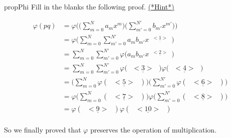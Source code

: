 \begin{exercise}{propPhi}
Fill in the blanks the following proof. \hyperref[sec:PolyVec:hints]{(*Hint*)} 

\begin{align*}
\varphi(pq) &= \varphi\Bigg(\Big(\sum^ {N}_{m=0} a_{m}x^{m}\Big)\Big( \sum^{N'}_{m'=0} b_{m'}x^{m'}\Big)\Bigg)\\
&= \varphi\Bigg(\sum^ {N}_{m=0}\sum^{N'}_{m'=0} a_{m}b_{m'} x^{\underline{\text{ $<1>$ }}} \Bigg)\\
&= \sum^ {N}_{m=0}\sum^{N'}_{m'=0}\varphi\big( a_{m}b_{m'} x^{\underline{\text{ $<2>$ }}} \big)\\
&= \sum^ {N}_{m=0}\sum^{N'}_{m'=0}\varphi\big( \underline{\text{ $<3>$ }} \big)\varphi\big(\underline{\text{ $<4>$ }}\big)\\
&= \Big(\sum^ {N}_{m=0}\varphi(\underline{\text{ $<5>$ }})\Big)\Big( \sum^{N'}_{m'=0}\varphi(\underline{\text{ $<6>$ }})\Big)\\
&= \varphi \Big(\sum^ {N}_{m=0}(\underline{\text{ $<7>$ }})\Big)\varphi\Big( \sum^{N'}_{m'=0}(\underline{\text{ $<8>$ }})\Big)\\
&= \varphi(\underline{\text{ $<9>$ }}) \varphi(\underline{\text{ $<10>$ }})\\
\end{align*}
\end{exercise}

So we finally proved that $\varphi$ preserves the operation of multiplication.\\



